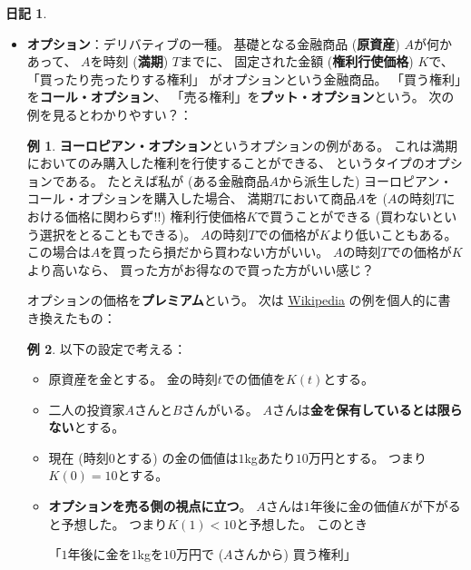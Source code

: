 \documentclass[uplatex]{jsarticle}
\theoremstyle{definition}
\newtheorem*{exam*}{例}
\newtheorem*{nikki*}{日記}
\begin{document}
\begin{nikki*}
\begin{itemize}
\begin{itemize}
      \item
      \textbf{オプション}：デリバティブの一種。
      基礎となる金融商品 (\textbf{原資産}) \(A\)が何かあって、
      \(A\)を時刻 (\textbf{満期}) \(T\)までに、
      固定された金額 (\textbf{権利行使価格}) \(K\)で、
      「買ったり売ったりする権利」
      がオプションという金融商品。
      「買う権利」を\textbf{コール・オプション}、
      「売る権利」を\textbf{プット・オプション}という。
      次の例を見るとわかりやすい？：
      \begin{framed}
        \begin{exam*}
          \textbf{ヨーロピアン・オプション}というオプションの例がある。
          これは満期においてのみ購入した権利を行使することができる、
          というタイプのオプションである。
          たとえば私が
          (ある金融商品\(A\)から派生した)
          ヨーロピアン・コール・オプションを購入した場合、
          満期\(T\)において商品\(A\)を
          (\(A\)の時刻\(T\)における価格に関わらず!!)
          権利行使価格\(K\)で買うことができる
          (買わないという選択をとることもできる)。
          \(A\)の時刻\(T\)での価格が\(K\)より低いこともある。
          この場合は\(A\)を買ったら損だから買わない方がいい。
          \(A\)の時刻\(T\)での価格が\(K\)より高いなら、
          買った方がお得なので買った方がいい感じ？
        \end{exam*}
      \end{framed}
      オプションの価格を\textbf{プレミアム}という。
      次は
      \href{https://ja.wikipedia.org/wiki/%E3%82%AA%E3%83%97%E3%82%B7%E3%83%A7%E3%83%B3%E5%8F%96%E5%BC%95}
      {Wikipedia}
      の例を個人的に書き換えたもの：
      \begin{framed}
        \begin{exam*}
          以下の設定で考える：
          \begin{itemize}
            \item
            原資産を金とする。
            金の時刻\(t\)での価値を\(K(t)\)とする。
            \item
            二人の投資家\(A\)さんと\(B\)さんがいる。
            \(A\)さんは\textbf{金を保有しているとは限らない}とする。
            \item
            現在 (時刻\(0\)とする)
            の金の価値は\(1\)kgあたり\(10\)万円とする。
            つまり\(K(0)=10\)とする。
            \item
            \textbf{オプションを売る側の視点に立つ}。
            \(A\)さんは\(1\)年後に金の価値\(K\)が下がると予想した。
            つまり\(K(1) < 10\)と予想した。
            このとき
            \begin{center}
              「\(1\)年後に金を\(1\)kgを\(10\)万円で
               (\(A\)さんから) 買う権利」


\end{center}
\end{itemize}
\end{exam*}
\end{framed}
\end{itemize}
\end{itemize}
\end{nikki*}
\end{document}
